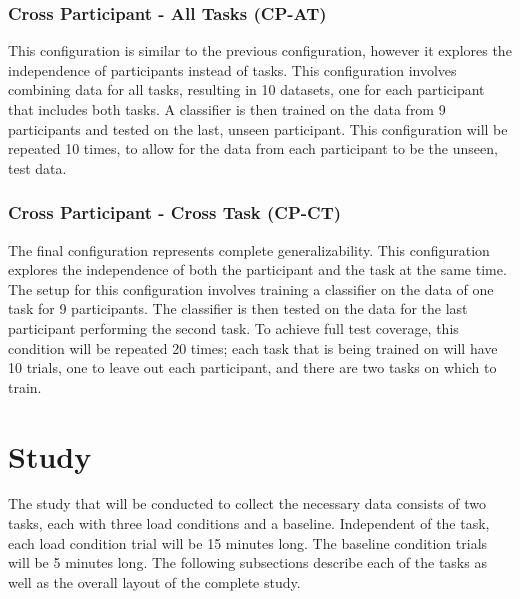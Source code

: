 \documentclass[11pt]{article}
\begin{document}
\subsubsection{Cross Participant - All Tasks (CP-AT)}
This configuration is similar to the previous configuration, however it explores the independence of participants instead of tasks. This configuration involves combining data for all tasks, resulting in 10 datasets, one for each participant that includes both tasks. A classifier is then trained on the data from 9 participants and tested on the last, unseen participant. This configuration will be repeated 10 times, to allow for the data from each participant to be the unseen, test data.

\subsubsection{Cross Participant - Cross Task (CP-CT)}
The final configuration represents complete generalizability. This configuration explores the independence of both the participant and the task at the same time. The setup for this configuration involves training a classifier on the data of one task for 9 participants. The classifier is then tested on the data for the last participant performing the second task. To achieve full test coverage, this condition will be repeated 20 times; each task that is being trained on will have 10 trials, one to leave out each participant, and there are two tasks on which to train.



\section{Study}
The study that will be conducted to collect the necessary data consists of two tasks, each with three load conditions and a baseline. Independent of the task, each load condition trial will be 15 minutes long. The baseline condition trials will be 5 minutes long. The following subsections describe each of the tasks as well as the overall layout of the complete study.
\end{document}
